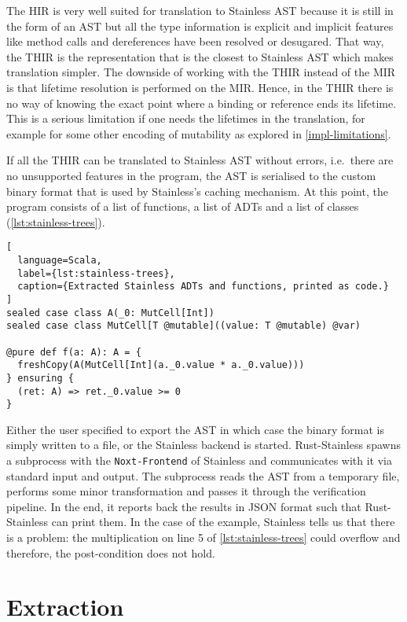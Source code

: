 The HIR is very well suited for translation to Stainless AST because it is still
in the form of an AST but all the type information is explicit and implicit
features like method calls and dereferences have been resolved or desugared.
That way, the THIR is the representation that is the closest to Stainless AST
which makes translation simpler. The downside of working with the THIR instead
of the MIR is that lifetime resolution is performed on the MIR. Hence, in the
THIR there is no way of knowing the exact point where a binding or reference
ends its lifetime. This is a serious limitation if one needs the lifetimes in
the translation, for example for some other encoding of mutability as explored
in \autoref{impl-limitations}.


If all the THIR can be translated to Stainless AST without errors, i.e.~there
are no unsupported features in the program, the AST is serialised to the custom
binary format that is used by Stainless's caching mechanism. At this point, the
program consists of a list of functions, a list of ADTs and a list of classes
(\autoref{lst:stainless-trees}).

\begin{lstlisting}[
  language=Scala,
  label={lst:stainless-trees},
  caption={Extracted Stainless ADTs and functions, printed as code.}
]
sealed case class A(_0: MutCell[Int])
sealed case class MutCell[T @mutable]((value: T @mutable) @var)

@pure def f(a: A): A = {
  freshCopy(A(MutCell[Int](a._0.value * a._0.value)))
} ensuring {
  (ret: A) => ret._0.value >= 0
}
\end{lstlisting}

Either the user specified to export the AST in which case the binary format is
simply written to a file, or the Stainless backend is started. Rust-Stainless
spawns a subprocess with the \passthrough{\lstinline!Noxt-Frontend!} of
Stainless and communicates with it via standard input and output. The subprocess
reads the AST from a temporary file, performs some minor transformation and
passes it through the verification pipeline. In the end, it reports back the
results in JSON format such that Rust-Stainless can print them. In the case of
the example, Stainless tells us that there is a problem: the multiplication on
line 5 of \autoref{lst:stainless-trees} could overflow and therefore, the
post-condition does not hold.



\section{Extraction}

